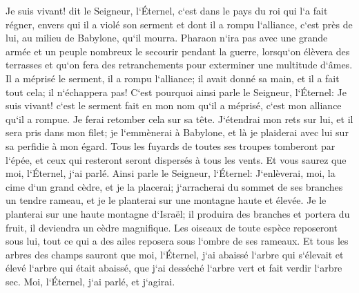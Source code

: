 \verse Je suis vivant! dit le Seigneur, l`Éternel, c`est dans le pays du roi qui l`a fait régner, envers qui il a violé son serment et dont il a rompu l`alliance, c`est près de lui, au milieu de Babylone, qu`il mourra. 
\verse Pharaon n`ira pas avec une grande armée et un peuple nombreux le secourir pendant la guerre, lorsqu`on élèvera des terrasses et qu`on fera des retranchements pour exterminer une multitude d`âmes. 
\verse Il a méprisé le serment, il a rompu l`alliance; il avait donné sa main, et il a fait tout cela; il n`échappera pas! 
\verse C`est pourquoi ainsi parle le Seigneur, l`Éternel: Je suis vivant! c`est le serment fait en mon nom qu`il a méprisé, c`est mon alliance qu`il a rompue. Je ferai retomber cela sur sa tête. 
\verse J`étendrai mon rets sur lui, et il sera pris dans mon filet; je l`emmènerai à Babylone, et là je plaiderai avec lui sur sa perfidie à mon égard. 
\verse Tous les fuyards de toutes ses troupes tomberont par l`épée, et ceux qui resteront seront dispersés à tous les vents. Et vous saurez que moi, l`Éternel, j`ai parlé. 
\verse Ainsi parle le Seigneur, l`Éternel: J`enlèverai, moi, la cime d`un grand cèdre, et je la placerai; j`arracherai du sommet de ses branches un tendre rameau, et je le planterai sur une montagne haute et élevée. 
\verse Je le planterai sur une haute montagne d`Israël; il produira des branches et portera du fruit, il deviendra un cèdre magnifique. Les oiseaux de toute espèce reposeront sous lui, tout ce qui a des ailes reposera sous l`ombre de ses rameaux. 
\verse Et tous les arbres des champs sauront que moi, l`Éternel, j`ai abaissé l`arbre qui s`élevait et élevé l`arbre qui était abaissé, que j`ai desséché l`arbre vert et fait verdir l`arbre sec. Moi, l`Éternel, j`ai parlé, et j`agirai. 

